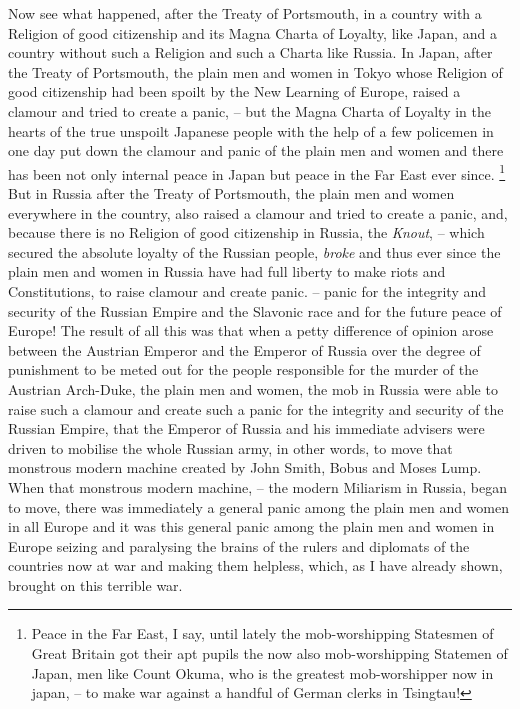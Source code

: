 Now see what happened, after the Treaty of Portsmouth, in a country with a Religion of good citizenship and its Magna Charta of Loyalty, like Japan, and a country without such a Religion and such a Charta like Russia. In Japan, after the Treaty of Portsmouth, the plain men and women in Tokyo whose Religion of good citizenship had been spoilt by the New Learning of Europe, raised a clamour and tried to create a panic,
-- but the Magna Charta of Loyalty in the hearts of the true unspoilt Japanese people with the help of a few policemen in one day
put down the clamour and panic of the plain men and women and there has been not only internal peace in Japan
but peace in the Far East ever since.
\footnote{
Peace in the Far East, I say, until lately the mob-worshipping Statesmen of Great Britain got their apt pupils the now also mob-worshipping Statemen of Japan, men like Count Okuma, who is the greatest mob-worshipper now in japan, -- to make war against a handful of German clerks in Tsingtau!
}
But in Russia after the Treaty of Portsmouth,
the plain men and women everywhere in the country,
also raised a clamour and tried to create a panic,
and, because there is no Religion of good citizenship in Russia, the \emph{Knout},
-- which secured the absolute loyalty of the Russian people,
\emph{broke} and thus ever since the plain men and women in Russia have had full liberty
to make riots and Constitutions,
to raise clamour and create panic.
-- panic for the integrity and security of the Russian Empire and the Slavonic race and for the future peace of Europe! The result of all this was that when a petty difference of opinion arose between the Austrian Emperor and the Emperor of Russia over the degree of punishment to be meted out for the people responsible for the murder of the Austrian Arch-Duke, the plain men and women, the mob in Russia were able to raise such a clamour and create such a panic for the integrity and security of the Russian Empire, that the Emperor of Russia and his immediate advisers were driven to mobilise the whole Russian army, in other words, to move that monstrous modern machine created by John Smith, Bobus and Moses Lump.
When that monstrous modern machine,
-- the modern Miliarism in Russia, began to move,
there was immediately a general panic among the plain men and women in all Europe
and it was this general panic among the plain men and women in Europe
seizing and paralysing the brains of the rulers and diplomats of the countries now at war
and making them helpless,
which, as I have already shown, brought on this terrible war.

